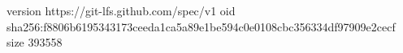 version https://git-lfs.github.com/spec/v1
oid sha256:f8806b6195343173ceeda1ca5a89e1be594c0e0108cbc356334df97909e2cecf
size 393558
